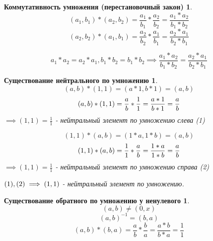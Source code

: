 \documentclass[14pt,a4paper,oneside,russian]{article}
\newtheorem*{axiom7}{Коммутативность умножения (перестановочный закон)}
\newtheorem*{axiom8}{Существование нейтрального по умножению}
\newtheorem*{axiom9}{Существование обратного по умножению у ненулевого}
\begin{document}
\begin{axiom7}
$$ (a_1, b_1) * (a_2, b_2) = \frac{a_1}{b_1} * \frac{a_2}{b_2} = \frac{a_1 * a_2}{b_1 * b_2} $$
$$ (a_2, b_2) * (a_1, b_1) = \frac{a_2}{b_2} * \frac{a_1}{b_1} = \frac{a_2 * a_1}{b_2 * b_1} $$

$$ a_1 * a_2 = a_2 * a_1, b_1 * b_2 = b_1 * b_2 \implies \frac{a_1 * a_2}{b_1 * b_2} = \frac{a_2 * a_1}{b_2 * b_1} $$
\end{axiom7}
\newpage

\begin{axiom8}
$$ (a, b) * (1, 1) = (a * 1, b * 1) = (a, b) $$
$$
(a, b) * (1, 1) = \frac{a}{b} * \frac{1}{1} = \frac{a * 1}{b * 1} = \frac{a}{b}
\newline
$$
$ \implies (1, 1) = \frac{1}{1} $ - нейтральный элемент по умножению слева (1)

$$ (1, 1) * (a, b) = (1 * a, 1 * b) = (a, b) $$
$$
(1, 1) * (a, b) = \frac{1}{1} * \frac{a}{b} = \frac{1 * a}{1 * b} = \frac{a}{b}
\newline
$$
$ \implies (1, 1) = \frac{1}{1} $ - нейтральный элемент по умножению справа (2)

$ \newline (1), (2) \implies (1, 1) $ - нейтральный элемент по умножению.
\end{axiom8}
\newpage

\begin{axiom9}
$$ (a, b) \neq (0, x) $$
$$ (a, b)^{-1} = (b, a) $$
$$ (a, b) * (b, a) = \frac{a}{b} * \frac{b}{a} = \frac{a * b}{b * a} = \frac{1}{1} $$
\end{axiom9}
\end{document}
